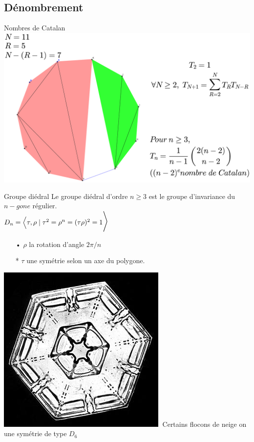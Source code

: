\documentclass[french,xcolor=dvipsnames]{beamer}
\begin{document}
		\subsection{Dénombrement}
		\begin{frame}{Nombres de Catalan}
			\includegraphics[scale=0.15]{nombres_catalans.eps}
		\end{frame}
		\begin{frame}{Groupe diédral}
			Le groupe diédral d'ordre $n\geqslant 3$ est le groupe d'invariance du $n-gone$ régulier.\\
			$D_{n}=\Big{\langle}\tau,\rho\; \LARGE{\mid}\; \tau^{2}=\rho^{n}=(\tau\rho)^{2}=1\Big{\rangle}$\\
			\begin{enumerate}
			\item[•] $\rho$ la rotation d'angle $2\pi/n$
			\item[*] $\tau$ une symétrie selon un axe du polygone.
			\end{enumerate}

			\includegraphics[scale=0.2]{snowflake.jpg}
		$\;$Certains flocons de neige on une symétrie de type $D_{6}$
			
		\end{frame}
		
\end{document}
